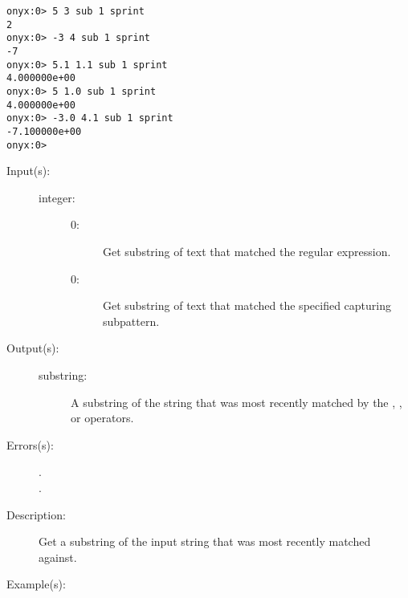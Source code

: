 \begin{description}
\begin{description}
\begin{verbatim}
onyx:0> 5 3 sub 1 sprint
2
onyx:0> -3 4 sub 1 sprint
-7
onyx:0> 5.1 1.1 sub 1 sprint
4.000000e+00
onyx:0> 5 1.0 sub 1 sprint
4.000000e+00
onyx:0> -3.0 4.1 sub 1 sprint
-7.100000e+00
onyx:0>
		\end{verbatim}
	\end{description}
\label{systemdict:submatch}
\item[{\onyxop{integer}{submatch}{substring}}: ]
	\begin{description}\item[]
	\item[Input(s): ]
		\begin{description}\item[]
		\item[integer: ]
			\begin{description}\item[]
			\item[0: ]
				Get substring of text that matched the regular
				expression.
			\item[{\gt}0: ]
				Get substring of text that matched the specified
				capturing subpattern.
			\end{description}
		\end{description}
	\item[Output(s): ]
		\begin{description}\item[]
		\item[substring: ]
			A substring of the string that was most recently matched
			by the
			,
			, or
			operators.
		\end{description}
	\item[Errors(s): ]
		\begin{description}\item[]
		\item[.]
		\item[.]
		\end{description}
	\item[Description: ]
		Get a substring of the input string that was most recently
		matched against.
	\item[Example(s): ]\begin{verbatim}


\end{verbatim}
\end{description}
\end{description}
